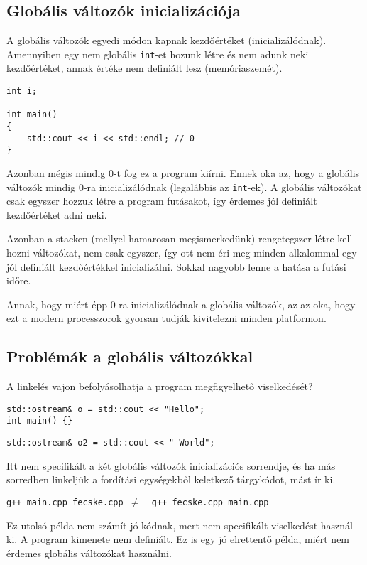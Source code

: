 \documentclass[a4paper,11.5pt,table]{article}
\begin{document}
	\subsection{Globális változók inicializációja}
	A globális változók egyedi módon kapnak kezdőértéket (inicializálódnak). Amennyiben egy nem globális \texttt{int}-et hozunk létre és nem adunk neki kezdőértéket, annak értéke nem definiált lesz (memóriaszemét).
	\begin{lstlisting}
int i;

int main() 
{
	std::cout << i << std::endl; // 0
}
	\end{lstlisting}   
	Azonban mégis mindig 0-t fog ez a program kiírni. Ennek oka az, hogy a globális változók mindig 0-ra inicializálódnak (legalábbis az \texttt{int}-ek). A globális változókat csak egyszer hozzuk létre a program futásakot, így érdemes jól definiált kezdőértéket adni neki.
	
	Azonban a stacken (mellyel hamarosan megismerkedünk) rengetegszer létre kell hozni változókat, nem csak egyszer, így ott nem éri meg minden alkalommal egy jól definiált kezdőértékkel inicializálni. Sokkal nagyobb lenne a hatása a futási időre.
	
	Annak, hogy miért épp 0-ra inicializálódnak a globális változók, az az oka, hogy ezt a modern processzorok gyorsan tudják kivitelezni minden platformon. 
	\subsection{Problémák a globális változókkal}
	
	A linkelés vajon befolyásolhatja a program megfigyelhető viselkedését?
	\bigskip
	
	\begin{lstlisting}
std::ostream& o = std::cout << "Hello";
int main() {}
	\end{lstlisting}
	\bigskip
	
	\begin{lstlisting}
std::ostream& o2 = std::cout << " World";
	\end{lstlisting}
	Itt nem specifikált a két globális változók inicializációs sorrendje, és ha más sorredben linkeljük a fordítási egységekből keletkező tárgykódot, mást ír ki.
	
	{\centering \texttt{g++ main.cpp fecske.cpp \quad $\not=$\quad\, g++ fecske.cpp main.cpp} \par}
	
	\begin{note}
		Ez utolsó példa nem számít jó kódnak, mert nem specifikált viselkedést használ ki. A program kimenete nem definiált. Ez is egy jó elrettentő példa, miért nem érdemes globális változókat használni.
	\end{note}
	
\end{document}

